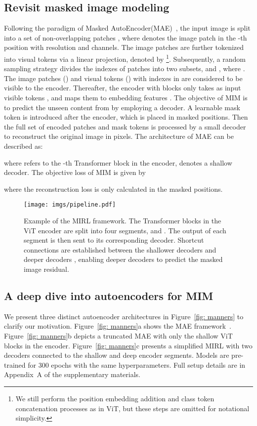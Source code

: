 \documentclass{article}
\begin{document}
\subsection{Revisit masked image modeling}
Following the paradigm of Masked AutoEncoder(MAE)~\cite{he2022masked}, the input image is split into a set of non-overlapping patches , where  denotes the image patch in the -th position with  resolution and  channels. The image patches are further tokenized into visual tokens via a linear projection, denoted by 
\footnote{We still perform the position embedding addition and class token concatenation processes as in ViT, but these steps are omitted for notational simplicity.}.
Subsequently, a random sampling strategy divides the indexes of patches into two subsets,  and , where .
The image patches () and visual tokens () with indexes in  are considered to be visible to the encoder.
Thereafter, the encoder with  blocks only takes as input visible tokens , and maps them to embedding features . The objective of MIM is to predict the unseen content from  by employing a decoder. A learnable mask token  is introduced after the encoder, which is placed in  masked positions. Then the full set of encoded patches and mask tokens is processed by a small decoder to reconstruct the original image in pixels. 
The architecture of MAE can be described as:

where  refers to the -th Transformer block in the encoder,  denotes a shallow decoder.
The objective loss of MIM is given by

where the reconstruction loss is only calculated in the masked positions.   


\begin{figure}[!t]
\begin{center}
\texttt{[image: imgs/pipeline.pdf]}
\end{center}
\caption{Example of the MIRL framework. The Transformer blocks in the ViT encoder are split into four segments,  and . The output of each segment is then sent to its corresponding decoder. Shortcut connections are established between the shallower decoders  and deeper decoders , enabling deeper decoders to predict the masked image residual.
} 
\label{fig: framework}
\end{figure}

\vspace{5pt}
\subsection{A deep dive into autoencoders for MIM}
\label{sec: A Deep Dive into AutoEncoders for MIM}
We present three distinct autoencoder architectures in Figure~\ref{fig: manners} to clarify our motivation. Figure~\ref{fig: manners}a shows the MAE framework~\cite{he2022masked}. Figure~\ref{fig: manners}b depicts a truncated MAE with only the shallow ViT blocks in the encoder. Figure~\ref{fig: manners}c presents a simplified MIRL with two decoders connected to the shallow and deep encoder segments. Models are pre-trained for 300 epochs with the same hyperparameters. Full setup details are in Appendix~A of the supplementary materials.
\end{document}

